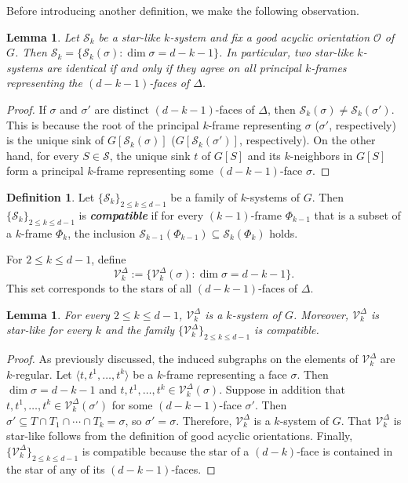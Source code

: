 \documentclass[11pt,twoside]{article}
\newtheorem{lemma}[theorem]{Lemma}
\theoremstyle{definition}
\newtheorem{definition}[theorem]{Definition}
\newcommand{\cS}{\mathcal{S}}
\newcommand{\cO}{\mathcal{O}}
\newcommand{\cV}{\mathcal{V}}
\begin{document}
Before introducing another definition, we make the following observation.
\begin{lemma}\label{lem:starlike}
    Let $\cS_k$ be a star-like $k$-system and fix a good acyclic orientation $\cO$ of $G$. Then $\cS_k = \{\cS_k(\sigma): \dim \sigma = d-k-1\}$. In particular, two star-like $k$-systems are identical if and only if they agree on all principal $k$-frames representing the $(d-k-1)$-faces of $\Delta$. 
\end{lemma}
\begin{proof}
    If $\sigma$ and $\sigma'$ are distinct $(d-k-1)$-faces of $\Delta$, then $\cS_k(\sigma) \ne \cS_k(\sigma')$. This is because the root of the principal $k$-frame representing $\sigma$ ($\sigma'$, respectively) is the unique sink of $G[\cS_k(\sigma)]$ ($G[\cS_k(\sigma')]$, respectively). On the other hand, for every $S \in \cS$, the unique sink $t$ of $G[S]$ and its $k$-neighbors in $G[S]$ form a principal $k$-frame representing some $(d-k-1)$-face $\sigma$. 
\end{proof}

\begin{definition}\label{def:compatible}
    Let $\{\cS_k\}_{2 \le k \le d-1}$ be a family of $k$-systems of $G$. Then $\{\cS_k\}_{2 \le k \le d-1}$ is \textbf{\emph{compatible}} if for every $(k-1)$-frame $\Phi_{k-1}$ that is a subset of a $k$-frame $\Phi_k$, the inclusion $\cS_{k-1}(\Phi_{k-1}) \subseteq \cS_k(\Phi_k)$ holds.
\end{definition}

For $2 \le k \le d-1$, define 
\[
\cV^\Delta_k := \{\cV^\Delta_k(\sigma): \dim \sigma = d-k-1\}.
\]
This set corresponds to the stars of all $(d-k-1)$-faces of $\Delta$. 
\begin{lemma}\label{lem:vk}
     For every $2 \le k \le d-1$, $\cV^\Delta_k$ is a $k$-system of $G$. Moreover, $\cV^\Delta_k$ is star-like for every $k$ and the family $\{\cV^\Delta_k\}_{2 \le k \le d-1}$ is compatible. 
\end{lemma}
\begin{proof}
As previously discussed, the induced subgraphs on the elements of $\cV^\Delta_k$ are $k$-regular. Let $\langle t, t^1, \dots, t^k \rangle$ be a $k$-frame representing a face $\sigma$. Then $\dim \sigma = d-k-1$ and $t, t^1, \dots, t^k \in \cV^\Delta_k(\sigma)$. Suppose in addition that $t, t^1, \dots, t^k \in \cV^\Delta_k(\sigma')$ for some $(d-k-1)$-face $\sigma'$. Then $\sigma' \subseteq T \cap T_1 \cap \cdots \cap T_k = \sigma$, so $\sigma' = \sigma$. Therefore, $\cV^\Delta_k$ is a $k$-system of $G$. That $\cV^\Delta_k$ is star-like follows from the definition of good acyclic orientations. Finally, $\{\cV^\Delta_k\}_{2 \le k \le d-1}$ is compatible because the star of a $(d-k)$-face is contained in the star of any of its $(d-k-1)$-faces. 
\end{proof}
\end{document}
